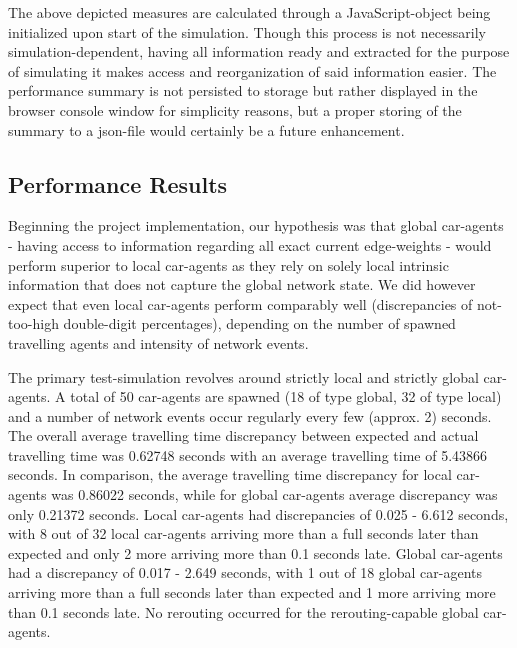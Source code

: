 The above depicted measures are calculated through a JavaScript-object being initialized upon start of the simulation. Though this process is not necessarily simulation-dependent, having all information ready and extracted for the purpose of simulating it makes access and reorganization of said information easier. The performance summary is not persisted to storage but rather displayed in the browser console window for simplicity reasons, but a proper storing of the summary to a json-file would certainly be a future enhancement. 


\subsection{Performance Results}

Beginning the project implementation, our hypothesis was that global car-agents - having access to information regarding all exact current edge-weights - would perform superior to local car-agents as they rely on solely local intrinsic information that does not capture the global network state. We did however expect that even local car-agents perform comparably well (discrepancies of not-too-high double-digit percentages), depending on the number of spawned travelling agents and intensity of network events.  

The primary test-simulation revolves around strictly local and strictly global car-agents.
A total of 50 car-agents are spawned (18 of type global, 32 of type local) and a number of network events occur regularly every few (approx. 2) seconds. \\
The overall average travelling time discrepancy between expected and actual travelling time was 0.62748 seconds with an average travelling time of 5.43866 seconds.
In comparison, the average travelling time discrepancy for local car-agents was 0.86022 seconds, while for global car-agents average discrepancy was only 0.21372 seconds.
Local car-agents had discrepancies of 0.025 - 6.612 seconds, with 8 out of 32 local car-agents arriving more than a full seconds later than expected and only 2 more arriving more than 0.1 seconds late.
Global car-agents had a discrepancy of 0.017 - 2.649 seconds, with 1 out of 18 global car-agents arriving more than a full seconds later than expected and 1 more arriving more than 0.1 seconds late.
No rerouting occurred for the rerouting-capable global car-agents. 


